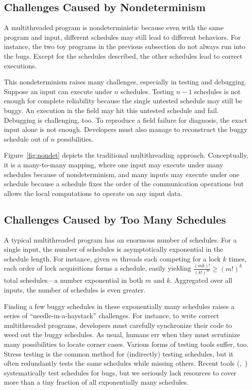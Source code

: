 \subsection{Challenges Caused by Nondeterminism} \label{sec:nondet}

A multithreaded program is nondeterministic because even with the same
program and input, different schedules may still lead to different
behaviors.  For instance, the two toy programs in the previous subsection
do not always run into the bugs.  Except for the schedules described, the
other schedules lead to correct executions.

This nondeterminism raises many challenges, especially in
testing and debugging.  Suppose an input can execute under $n$ schedules.
Testing $n-1$ schedules is not enough for complete reliability because the
single untested schedule may still be buggy.  An execution in the field
may hit this untested schedule and fail.  Debugging is challenging, too.
To reproduce a field failure for diagnosis, the exact input alone is not
enough. Developers must also manage to reconstruct the buggy schedule out
of $n$ possibilities.

Figure~\ref{fig:nondet} depicts the traditional multithreading approach.
Conceptually, it is a many-to-many mapping, where one input may execute
under many schedules because of nondeterminism, and many inputs may
execute under one schedule because a schedule fixes the order of the
communication operations but allows the local computations to operate on
any input data.

\subsection{Challenges Caused by Too Many Schedules}

A typical multithreaded program has an enormous number of schedules.  For
a single input, the number of schedules is asymptotically exponential in
the schedule length.  For instance, given $m$ threads each competing for a
lock $k$ times, each order of lock acquisitions forms a
schedule, easily yielding $\frac{(mk)!}{(k!)^m} \ge
(m!)^k$ total schedules---a number exponential in both $m$ and $k$.
Aggregated over all inputs, the number of schedules is even greater.

Finding a few buggy schedules in these exponentially many schedules raises
a series of ``needle-in-a-haystack'' challenges.  For instance, to write
correct multithreaded programs, developers must carefully synchronize
their code to weed out the buggy schedules.  As usual, humans err when
they must scrutinize many possibilities to locate corner cases. Various
forms of testing tools suffer, too.  Stress testing is the common method
for (indirectly) testing schedules, but it often redundantly tests the
same schedules while missing others.  Recent tools
(\eg,~\cite{musuvathi:chess:osdi08}) systematically test
schedules for bugs, but we seriously lack resources to cover more than a tiny
fraction of all exponentially many schedules.

